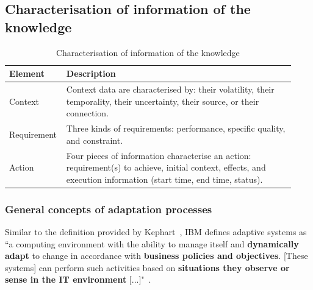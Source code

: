 %

\subsection{Characterisation of information of the knowledge}

\begin{table}
	\begin{center}
    	\begin{tabular}{p{0.15\linewidth}p{0.78\linewidth}}
    		\hline
    		\textbf{Element} & \textbf{Description} \\
    		\hline
    		Context & Context data are characterised by: their volatility, their temporality, their uncertainty, their source, or their connection.\\
    		Requirement & Three kinds of requirements: performance, specific quality, and constraint. \\
    		Action & Four pieces of information characterise an action: requirement(s) to achieve, initial context, effects, and execution information (start time, end time, status).\\
    		\hline
    	\end{tabular}
    	\caption{Characterisation of information of the knowledge}
    	\label{table:background:adptSyst:charc}
    \end{center}
\end{table}


\subsubsection{General concepts of adaptation processes}

Similar to the definition provided by Kephart~\cite{DBLP:journals/computer/KephartC03}, IBM  defines adaptive systems as ``a computing environment with the ability to manage itself and \textbf{dynamically adapt} to change in accordance with \textbf{business policies and objectives}. [These systems] can perform such activities based on \textbf{situations they observe or sense in the IT environment} [...]"~\cite{computing2006architectural}.

